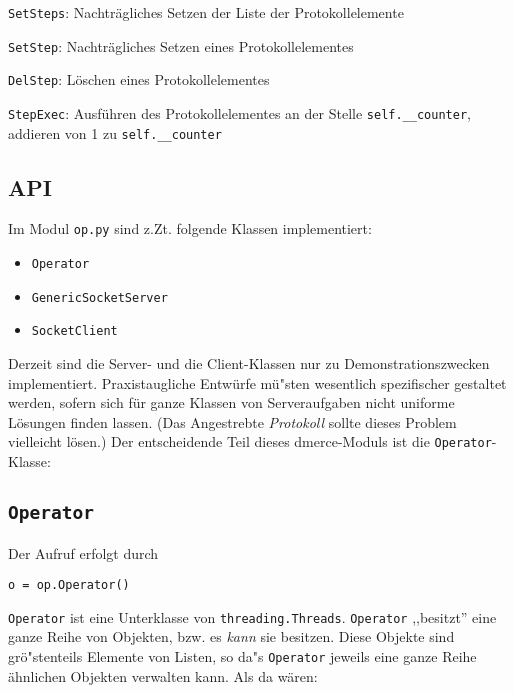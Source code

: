 \begin{description}

\item \texttt{SetSteps}: Nachtr\"agliches Setzen der Liste
der Protokollelemente

\item \texttt{SetStep}: Nachtr\"agliches Setzen eines
Protokollelementes

\item \texttt{DelStep}: L\"oschen eines Protokollelementes

\item \texttt{StepExec}: Ausf\"uhren des Protokollelementes
an der Stelle \texttt{self.\_\_counter}, addieren von 1 zu
\texttt{self.\_\_counter}

\end{description}

\subsection{API}

Im Modul \texttt{op.py} sind z.Zt. folgende Klassen implementiert:

\begin{itemize}
\item \texttt{Operator}
\item \texttt{GenericSocketServer}
\item \texttt{SocketClient}
\end{itemize}

Derzeit sind die Server- und die Client-Klassen nur zu
Demonstrationszwecken implementiert. Praxistaugliche Entw\"urfe
m\"u"sten wesentlich spezifischer gestaltet werden, sofern sich f\"ur
ganze Klassen von Serveraufgaben nicht uniforme L\"osungen finden
lassen. (Das Angestrebte \textit{Protokoll} sollte dieses Problem
vielleicht l\"osen.)  Der entscheidende Teil dieses dmerce-Moduls ist
die \texttt{Operator}-Klasse:

\subsection{\texttt{Operator}}

Der Aufruf erfolgt durch \\

\bigskip

\texttt{o = op.Operator()} \\

\bigskip

\texttt{Operator} ist eine Unterklasse von \texttt{threading.Threads}.
\texttt{Operator} ,,besitzt'' eine ganze Reihe von Objekten, bzw. es
\textit{kann} sie besitzen. Diese Objekte sind gr\"o"stenteils
Elemente von Listen, so da"s \texttt{Operator} jeweils eine ganze
Reihe \"ahnlichen Objekten verwalten kann. Als da w\"aren:

